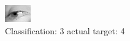 \begin{figure}[h!]
\begin{center}
\includegraphics[width=0.60\columnwidth]{figures/ID3065_class_3_target_4.png}
\end{center}
\caption{ Classification: 3 actual target: 4}
\label{fig:ID3065_class_3_target_4}
\end{figure}
